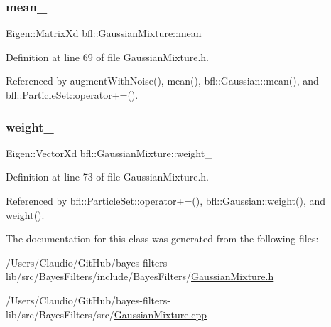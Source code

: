 \subsubsection{\texorpdfstring{mean\+\_\+}{mean\_}}
{\footnotesize\ttfamily Eigen\+::\+Matrix\+Xd bfl\+::\+Gaussian\+Mixture\+::mean\+\_\+\hspace{0.3cm}{\ttfamily [protected]}}



Definition at line 69 of file Gaussian\+Mixture.\+h.



Referenced by augment\+With\+Noise(), mean(), bfl\+::\+Gaussian\+::mean(), and bfl\+::\+Particle\+Set\+::operator+=().

\mbox{\label{classbfl_1_1GaussianMixture_ac9ce000575d6b29ad8e1a756d750faff}} 
\subsubsection{\texorpdfstring{weight\+\_\+}{weight\_}}
{\footnotesize\ttfamily Eigen\+::\+Vector\+Xd bfl\+::\+Gaussian\+Mixture\+::weight\+\_\+\hspace{0.3cm}{\ttfamily [protected]}}



Definition at line 73 of file Gaussian\+Mixture.\+h.



Referenced by bfl\+::\+Particle\+Set\+::operator+=(), bfl\+::\+Gaussian\+::weight(), and weight().



The documentation for this class was generated from the following files\+:\begin{DoxyCompactItemize}
\item 
/\+Users/\+Claudio/\+Git\+Hub/bayes-\/filters-\/lib/src/\+Bayes\+Filters/include/\+Bayes\+Filters/\mbox{\hyperlink{GaussianMixture_8h}{Gaussian\+Mixture.\+h}}\item 
/\+Users/\+Claudio/\+Git\+Hub/bayes-\/filters-\/lib/src/\+Bayes\+Filters/src/\mbox{\hyperlink{GaussianMixture_8cpp}{Gaussian\+Mixture.\+cpp}}\end{DoxyCompactItemize}
